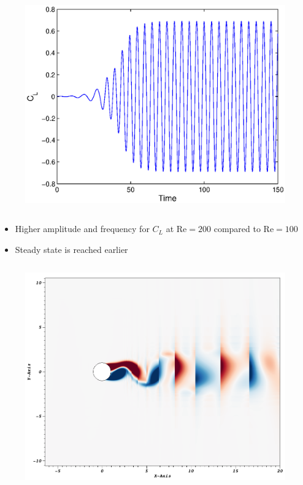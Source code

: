 \begin{frame}[allowframebreaks]
\begin{columns}[t]
				\column[]{6.5cm}
				\vspace{-1cm}
			\begin{figure}[htp]
				\centering		
				\includegraphics[width=\textwidth]{img/re200dg3cpd60cl.eps}
			\end{figure}
			\end{columns}
			\begin{itemize}
				\item Higher amplitude and frequency for $C_L$ at $\text{Re}=200$ compared to $\text{Re}=100$
				\item Steady state is reached earlier
			\end{itemize}
			\vspace{5cm}
			\begin{columns}[t]
				\column[]{6cm}
				\vspace{-1cm}
				\begin{figure}[htp]
					\centering		
					\includegraphics[width=\textwidth]{img/re100dg3cpd60.png}

\end{figure}
\end{columns}
\end{frame}
